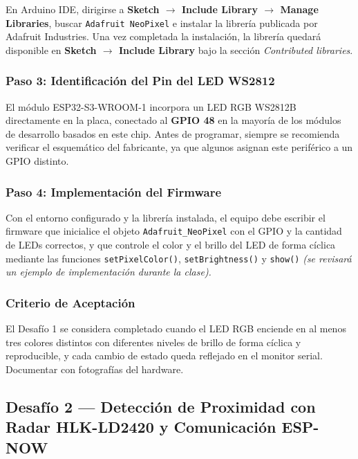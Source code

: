 \documentclass[12pt,leqno]{article}
\begin{document}
En Arduino IDE, dirigirse a \textbf{Sketch $\rightarrow$ Include Library $\rightarrow$
Manage Libraries}, buscar \texttt{Adafruit NeoPixel} e instalar la librer\'ia
publicada por Adafruit Industries. Una vez completada la instalaci\'on, la librer\'ia
quedar\'a disponible en \textbf{Sketch $\rightarrow$ Include Library} bajo la
secci\'on \textit{Contributed libraries}.

\subsubsection*{Paso 3: Identificaci\'on del Pin del LED WS2812}

El m\'odulo ESP32-S3-WROOM-1 incorpora un LED RGB WS2812B directamente en la placa,
conectado al \textbf{GPIO 48} en la mayor\'ia de los m\'odulos de desarrollo basados
en este chip. Antes de programar, siempre se recomienda verificar el esquem\'atico del fabricante, ya que algunos asignan este perif\'erico a un GPIO distinto.

\subsubsection*{Paso 4: Implementaci\'on del Firmware}

Con el entorno configurado y la librer\'ia instalada, el equipo debe escribir el
firmware que inicialice el objeto \texttt{Adafruit\_NeoPixel} con el GPIO y la
cantidad de LEDs correctos, y que controle el color y el brillo del LED de forma
c\'iclica mediante las funciones \texttt{setPixelColor()}, \texttt{setBrightness()}
y \texttt{show()} \textit{(se revisar\'a un ejemplo de implementaci\'on durante la
clase).}

\subsubsection*{Criterio de Aceptaci\'on}

El Desaf\'io 1 se considera completado cuando el LED RGB enciende en al menos tres
colores distintos con diferentes niveles de brillo de forma c\'iclica y reproducible,
y cada cambio de estado queda reflejado en el monitor serial. Documentar con
fotograf\'ias del hardware.

\newpage
\subsection{Desaf\'io 2 --- Detecci\'on de Proximidad con Radar HLK-LD2420 y Comunicaci\'on ESP-NOW}
\label{sec:desafio2}
\end{document}
